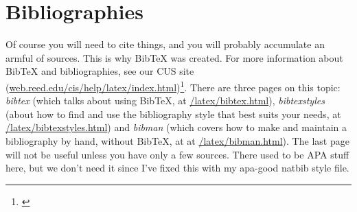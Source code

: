 \documentclass[12pt,twoside]{reedthesis}
\begin{document}



	
\section{Bibliographies}
	Of course you will need to cite things, and you will probably accumulate an armful of sources. This is why BibTeX was created. For more information about BibTeX and bibliographies, see our CUS site (\url{web.reed.edu/cis/help/latex/index.html})\footnote{\cite{reedweb:2007}}. There are three pages on this topic: {\it bibtex} (which talks about using BibTeX, at \url{/latex/bibtex.html}), {\it bibtexstyles} (about how to find and use the bibliography style that best suits your needs, at \url{/latex/bibtexstyles.html}) and {\it bibman} (which covers how to make and maintain a bibliography by hand, without BibTeX, at at \url{/latex/bibman.html}). The last page will not be useful unless you have only a few sources. There used to be APA stuff here, but we don't need it since I've fixed this with my apa-good natbib style file.
	
\end{document}
